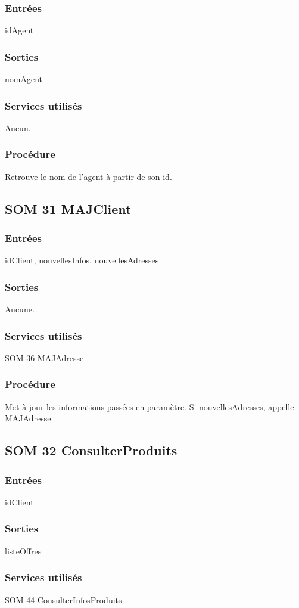 \subsubsection{Entrées}
idAgent
\subsubsection{Sorties}
nomAgent
\subsubsection{Services utilisés}
Aucun.
\subsubsection{Procédure}
Retrouve le nom de l'agent à partir de son id.

\subsection{SOM 31 MAJClient}
\subsubsection{Entrées}
idClient, nouvellesInfos, nouvellesAdresses
\subsubsection{Sorties}
Aucune.
\subsubsection{Services utilisés}
SOM 36 MAJAdresse
\subsubsection{Procédure}
Met à jour les informations passées en paramètre.
Si nouvellesAdresses, appelle MAJAdresse.

\subsection{SOM 32 ConsulterProduits}
\subsubsection{Entrées}
idClient
\subsubsection{Sorties}
listeOffres
\subsubsection{Services utilisés}
SOM 44 ConsulterInfosProduits
